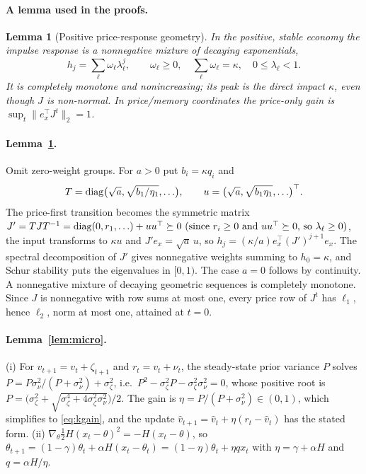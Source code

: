 \documentclass[12pt]{article}
\newtheorem{lemma}[theorem]{Lemma}
\theoremstyle{definition}
\theoremstyle{remark}
\begin{document}
\paragraph{A lemma used in the proofs.}
\begin{lemma}[Positive price-response geometry]\label{lem:cm}
In the positive, stable economy the impulse response is a nonnegative mixture of decaying exponentials,
\[
h_j=\sum_\ell \omega_\ell\lambda_\ell^j,\qquad \omega_\ell\ge0,\quad \sum_\ell\omega_\ell=\kappa,\quad 0\le\lambda_\ell<1 .
\]
It is completely monotone and nonincreasing; its peak is the direct impact $\kappa$, even though $J$ is non-normal. In price/memory coordinates the price-only gain is $\sup_t\|e_x^\top J^t\|_2=1$.
\end{lemma}

\paragraph{Lemma~\ref{lem:cm}.} Omit zero-weight groups. For $a>0$ put $b_i=\kappa q_i$ and
\[
T={\rm diag}\bigl(\sqrt a,\sqrt{b_1/\eta_1},\ldots\bigr),\qquad u=\bigl(\sqrt a,\sqrt{b_1\eta_1},\ldots\bigr)^\top .
\]
The price-first transition becomes the symmetric matrix $J'=TJT^{-1}={\rm diag}(0,r_1,\ldots)+uu^\top \succeq 0\text{ (since }r_i\ge 0\text{ and }uu^\top\succeq 0\text{, so }\lambda_\ell\ge 0)$, the input transforms to $\kappa u$ and $J'e_x=\sqrt a\,u$, so $h_j=(\kappa/a)e_x^\top(J')^{j+1}e_x$. The spectral decomposition of $J'$ gives nonnegative weights summing to $h_0=\kappa$, and Schur stability puts the eigenvalues in $[0,1)$. The case $a=0$ follows by continuity. A nonnegative mixture of decaying geometric sequences is completely monotone. Since $J$ is nonnegative with row sums at most one, every price row of $J^t$ has $\ell_1$, hence $\ell_2$, norm at most one, attained at $t=0$.


\paragraph{Lemma~\ref{lem:micro}.} (i) For $v_{t+1}=v_t+\zeta_{t+1}$ and $r_t=v_t+\nu_t$, the steady-state prior variance $P$ solves $P=P\sigma_\nu^2/(P+\sigma_\nu^2)+\sigma_\zeta^2$, i.e.\ $P^2-\sigma_\zeta^2P-\sigma_\zeta^2\sigma_\nu^2=0$, whose positive root is $P=\bigl(\sigma_\zeta^2+\sqrt{\sigma_\zeta^4+4\sigma_\zeta^2\sigma_\nu^2}\bigr)/2$. The gain is $\eta=P/(P+\sigma_\nu^2)\in(0,1)$, which simplifies to \eqref{eq:kgain}, and the update $\hat v_{t+1}=\hat v_t+\eta(r_t-\hat v_t)$ has the stated form. (ii) $\nabla_\theta\tfrac12H(x_t-\theta)^2=-H(x_t-\theta)$, so $\theta_{t+1}=(1-\gamma)\theta_t+\alpha H(x_t-\theta_t)=(1-\eta)\theta_t+\eta qx_t$ with $\eta=\gamma+\alpha H$ and $q=\alpha H/\eta$.
\end{document}
